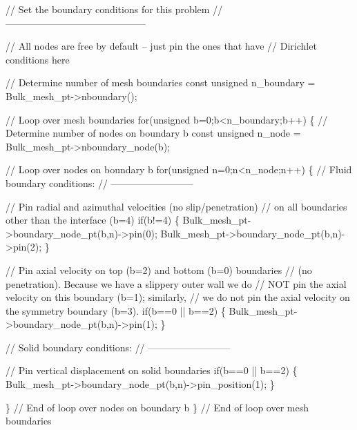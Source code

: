 \begin{DoxyCodeInclude}
 \textcolor{comment}{// Set the boundary conditions for this problem}
 \textcolor{comment}{// --------------------------------------------}

 \textcolor{comment}{// All nodes are free by default -- just pin the ones that have}
 \textcolor{comment}{// Dirichlet conditions here}

 \textcolor{comment}{// Determine number of mesh boundaries}
 \textcolor{keyword}{const} \textcolor{keywordtype}{unsigned} n\_boundary = Bulk\_mesh\_pt->nboundary();

 \textcolor{comment}{// Loop over mesh boundaries}
 \textcolor{keywordflow}{for}(\textcolor{keywordtype}{unsigned} b=0;b<n\_boundary;b++)
  \{
   \textcolor{comment}{// Determine number of nodes on boundary b}
   \textcolor{keyword}{const} \textcolor{keywordtype}{unsigned} n\_node = Bulk\_mesh\_pt->nboundary\_node(b);

   \textcolor{comment}{// Loop over nodes on boundary b}
   \textcolor{keywordflow}{for}(\textcolor{keywordtype}{unsigned} n=0;n<n\_node;n++)
    \{
     \textcolor{comment}{// Fluid boundary conditions:}
     \textcolor{comment}{// --------------------------}

     \textcolor{comment}{// Pin radial and azimuthal velocities (no slip/penetration)}
     \textcolor{comment}{// on all boundaries other than the interface (b=4)}
     \textcolor{keywordflow}{if}(b!=4)
      \{
       Bulk\_mesh\_pt->boundary\_node\_pt(b,n)->pin(0);
       Bulk\_mesh\_pt->boundary\_node\_pt(b,n)->pin(2);
      \}

     \textcolor{comment}{// Pin axial velocity on top (b=2) and bottom (b=0) boundaries}
     \textcolor{comment}{// (no penetration). Because we have a slippery outer wall we do}
     \textcolor{comment}{// NOT pin the axial velocity on this boundary (b=1); similarly,}
     \textcolor{comment}{// we do not pin the axial velocity on the symmetry boundary (b=3).}
     \textcolor{keywordflow}{if}(b==0 || b==2) \{ Bulk\_mesh\_pt->boundary\_node\_pt(b,n)->pin(1); \}

     \textcolor{comment}{// Solid boundary conditions:}
     \textcolor{comment}{// --------------------------}

     \textcolor{comment}{// Pin vertical displacement on solid boundaries}
     \textcolor{keywordflow}{if}(b==0 || b==2) \{ Bulk\_mesh\_pt->boundary\_node\_pt(b,n)->pin\_position(1); \}

    \} \textcolor{comment}{// End of loop over nodes on boundary b}
  \} \textcolor{comment}{// End of loop over mesh boundaries}

\end{DoxyCodeInclude}


